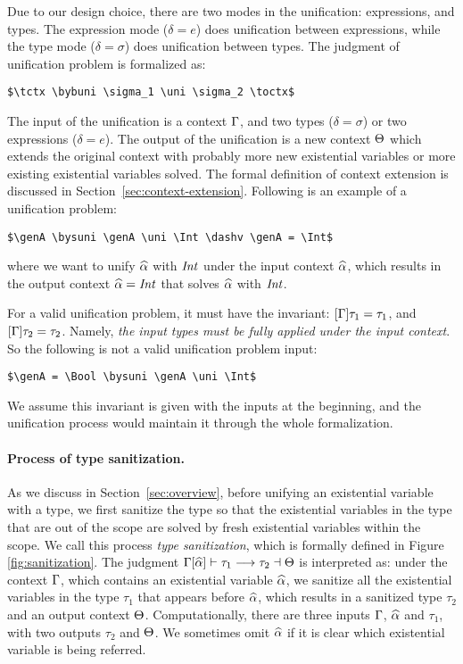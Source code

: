 Due to our design choice, there are two modes in the
unification: expressions, and types. The expression mode ($\delta = e$) does
unification between expressions, while the type mode ($\delta = \sigma$) does
unification between types.
The judgment of unification problem is formalized as:

\begin{lstlisting}
$\tctx \bybuni \sigma_1 \uni \sigma_2 \toctx$
\end{lstlisting}

The input of the unification is a context $\Gamma$, and two types
($\delta = \sigma$) or two expressions ($\delta = e$).
The output of the unification
is a new context $\Theta$ which extends the original context with probably more
new existential variables or more existing
existential variables solved.
The formal definition of context extension is discussed in
Section~\ref{sec:context-extension}.
Following is an example of a unification problem:

\begin{lstlisting}
$\genA \bysuni \genA \uni \Int \dashv \genA = \Int$
\end{lstlisting}

\noindent where we want to unify $\widehat{\alpha}$ with $\mathit{Int}$ under the input context
$\widehat{\alpha}$, which results in the output context $\widehat{\alpha} = \mathit{Int}$ that solves $\widehat{\alpha}$
with $\mathit{Int}$.

For a valid unification problem, it must have the invariant: $[\Gamma] \tau_1 =
\tau_1$, and $[\Gamma] \tau_2 = \tau_2$. Namely,
\textit{the input types must be
fully applied under the input context}.
 So the following is not a valid
unification problem input:

\begin{lstlisting}
$\genA = \Bool \bysuni \genA \uni \Int$
\end{lstlisting}

We assume this invariant is given with the inputs at the beginning,
and the unification process would maintain it through the whole
formalization.

\paragraph{Process of type sanitization.}

As we discuss in Section~\ref{sec:overview}, before unifying an existential
variable with a type, we first sanitize the type so that the existential
variables in the type that are out of the scope are solved by fresh existential
variables within the scope. We call this process \textit{type sanitization},
which is formally defined in Figure \ref{fig:sanitization}. The judgment
$\Gamma[\widehat{\alpha}] \vdash \tau_1 \longrightarrow \tau_2 \dashv \Theta$ is interpreted as: under the
context $\Gamma$, which contains an existential variable $\widehat{\alpha}$, we sanitize all
the existential variables in the type $\tau_1$ that appears before $\widehat{\alpha}$,
which results in a sanitized type $\tau_2$ and an output context $\Theta$. Computationally, there are three
inputs $\Gamma$, $\widehat{\alpha}$ and $\tau_1$, with two outputs $\tau_2$ and $\Theta$.
We sometimes omit $\widehat{\alpha}$ if it is clear which existential variable is being referred.

